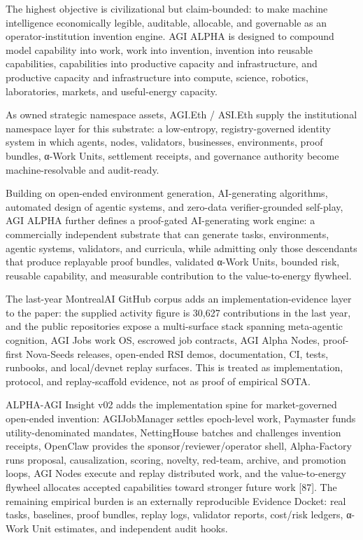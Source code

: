 The highest objective is civilizational but claim-bounded: to make
machine intelligence economically legible, auditable, allocable, and
governable as an operator-institution invention engine. AGI ALPHA is
designed to compound model capability into work, work into invention,
invention into reusable capabilities, capabilities into productive
capacity and infrastructure, and productive capacity and infrastructure
into compute, science, robotics, laboratories, markets, and
useful-energy capacity.

As owned strategic namespace assets, AGI.Eth / ASI.Eth supply the
institutional namespace layer for this substrate: a low-entropy,
registry-governed identity system in which agents, nodes, validators,
businesses, environments, proof bundles, α-Work Units, settlement
receipts, and governance authority become machine-resolvable and
audit-ready.

Building on open-ended environment generation, AI-generating algorithms,
automated design of agentic systems, and zero-data verifier-grounded
self-play, AGI ALPHA further defines a proof-gated AI-generating work
engine: a commercially independent substrate that can generate tasks,
environments, agentic systems, validators, and curricula, while
admitting only those descendants that produce replayable proof bundles,
validated α-Work Units, bounded risk, reusable capability, and
measurable contribution to the value-to-energy flywheel.

The last-year MontrealAI GitHub corpus adds an implementation-evidence
layer to the paper: the supplied activity figure is 30,627 contributions
in the last year, and the public repositories expose a multi-surface
stack spanning meta-agentic cognition, AGI Jobs work OS, escrowed job
contracts, AGI Alpha Nodes, proof-first Nova-Seeds releases, open-ended
RSI demos, documentation, CI, tests, runbooks, and local/devnet replay
surfaces. This is treated as implementation, protocol, and
replay-scaffold evidence, not as proof of empirical SOTA.

ALPHA-AGI Insight v02 adds the implementation spine for market-governed
open-ended invention: AGIJobManager settles epoch-level work, Paymaster
funds utility-denominated mandates, NettingHouse batches and challenges
invention receipts, OpenClaw provides the sponsor/reviewer/operator
shell, Alpha-Factory runs proposal, causalization, scoring, novelty,
red-team, archive, and promotion loops, AGI Nodes execute and replay
distributed work, and the value-to-energy flywheel allocates accepted
capabilities toward stronger future work {[}87{]}. The remaining
empirical burden is an externally reproducible Evidence Docket: real
tasks, baselines, proof bundles, replay logs, validator reports,
cost/risk ledgers, α-Work Unit estimates, and independent audit hooks.

